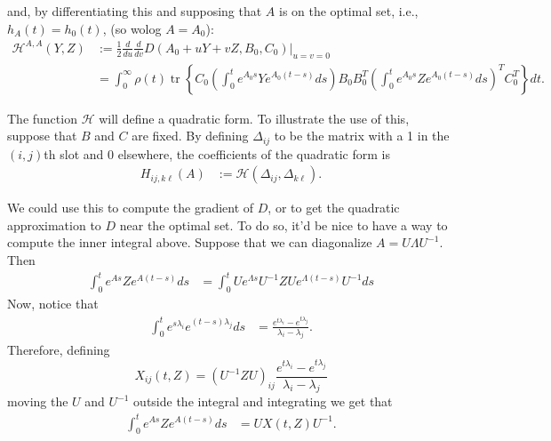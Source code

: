 \documentclass{article}
\newcommand{\tr}{\mathop{\mbox{tr}}} %
\newcommand{\calH}{\mathcal{H}}
\newcommand{\1}{\mathbbm{1}}
\begin{document}
and, by differentiating this and supposing that $A$ is on the optimal set,
i.e., $h_A(t)=h_0(t)$, (so wolog $A=A_0$):
\begin{equation}
  \begin{aligned}
      \calH^{A,A}(Y,Z) 
      &:= 
      \frac{1}{2} \frac{d}{du} \frac{d}{dv} D(A_0+uY+vZ,B_0,C_0)\vert_{u=v=0} \\
      &=
        \int_0^\infty \rho(t) \tr\left\{ C_0 
        \left( \int_0^t e^{A_0 s} Y e^{A_0 (t-s)} ds \right) 
        B_0 B_0^T 
        \left( \int_0^t e^{A_0 s} Z e^{A_0 (t-s)} ds \right)^T
        C_0^T \right\} dt  .
  \end{aligned}
\end{equation}

The function $\calH$ will define a quadratic form.
To illustrate the use of this, suppose that $B$ and $C$ are fixed.
By defining $\Delta_{ij}$ to be the matrix with a 1 in the $(i,j)$th slot
and 0 elsewhere,
the coefficients of the quadratic form is
\begin{equation}
    \begin{aligned}
        H_{ij, k\ell}(A)
        &:=
        \calH(\Delta_{ij}, \Delta_{k\ell}) .
    \end{aligned}
\end{equation}

We could use this to compute the gradient of $D$,
or to get the quadratic approximation to $D$ near the optimal set.
To do so, it'd be nice to have a way to compute the inner integral above.
Suppose that we can diagonalize $A = U \Lambda U^{-1}$.
Then
\begin{equation} \label{eqn:exp_deriv}
  \begin{aligned}
      \int_0^t e^{As} Z e^{A(t-s)} ds 
      &=
      \int_0^t U e^{\Lambda s} U^{-1} Z U e^{\Lambda (t-s)} U^{-1} ds 
  \end{aligned}
\end{equation}
Now, notice that
\begin{equation}
  \begin{aligned}
      \int_0^t e^{s \lambda_i} e^{(t-s) \lambda_j} ds
      &=
      \frac{ e^{t \lambda_i} - e^{t \lambda_j} }{ \lambda_i - \lambda_j } .
  \end{aligned}
\end{equation}
Therefore, 
defining
\begin{equation}
    X_{ij}(t,Z) = \left( U^{-1} Z U \right)_{ij}
      \frac{ e^{t \lambda_i} - e^{t \lambda_j} }{ \lambda_i - \lambda_j } 
\end{equation}
moving the $U$ and $U^{-1}$ outside the integral and integrating we get that
\begin{equation}
  \begin{aligned}
      \int_0^t e^{As} Z e^{A(t-s)} ds 
      &=
      U X(t,Z) U^{-1} .
  \end{aligned}
\end{equation}
\end{document}
